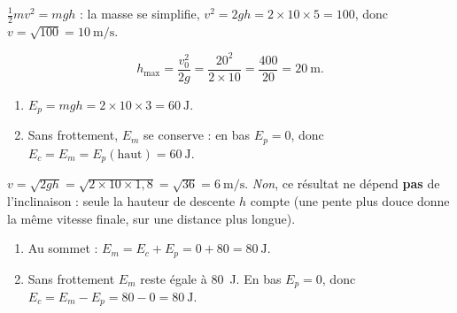 \documentclass[11pt,a4paper]{article}
\begin{document}

\begin{corrige}
$\tfrac12 m v^2=mgh$ : la masse se simplifie, $v^2=2gh=2\times10\times5=100$, donc
$v=\sqrt{100}=\qty{10}{\metre\per\second}$.
\end{corrige}

\begin{corrige}
\[
h_{\max}=\frac{v_0^2}{2g}=\frac{20^2}{2\times10}=\frac{400}{20}=\qty{20}{\metre}.
\]
\end{corrige}

\begin{corrige}
\begin{enumerate}[label=\alph*)]
  \item $E_p=mgh=2\times10\times3=\qty{60}{\joule}$.
  \item Sans frottement, $E_m$ se conserve : en bas $E_p=0$, donc $E_c=E_m=E_p(\text{haut})=\qty{60}{\joule}$.
\end{enumerate}
\end{corrige}

\begin{corrige}
$v=\sqrt{2gh}=\sqrt{2\times10\times1,8}=\sqrt{36}=\qty{6}{\metre\per\second}$.
\emph{Non}, ce résultat ne dépend \textbf{pas} de l'inclinaison : seule la hauteur de descente $h$
compte (une pente plus douce donne la même vitesse finale, sur une distance plus longue).
\end{corrige}

\begin{corrige}
\begin{enumerate}[label=\alph*)]
  \item Au sommet : $E_m=E_c+E_p=0+80=\qty{80}{\joule}$.
  \item Sans frottement $E_m$ reste égale à \qty{80}{\joule}. En bas $E_p=0$, donc
        $E_c=E_m-E_p=80-0=\qty{80}{\joule}$.
\end{enumerate}
\end{corrige}
\end{document}

